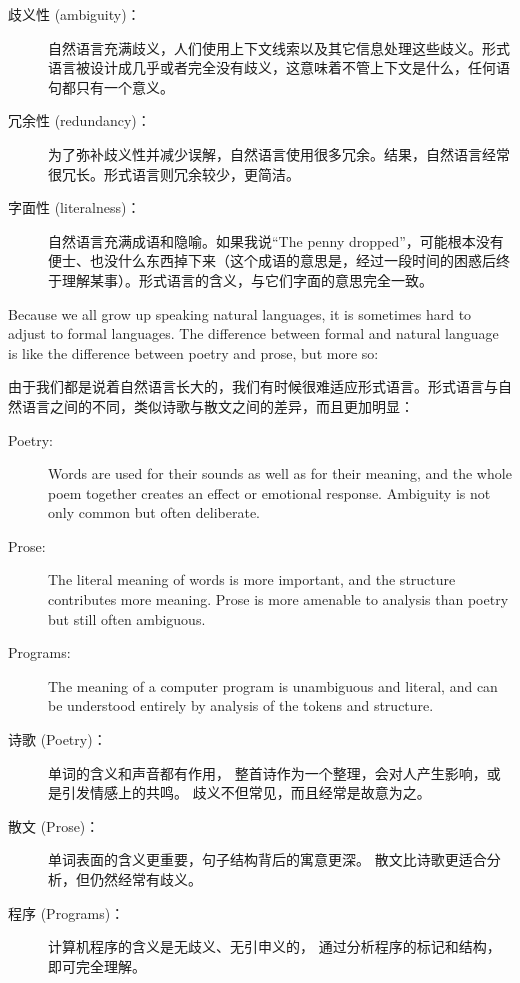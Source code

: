 \begin{description}

\item[歧义性 (ambiguity)：] 自然语言充满歧义，人们使用上下文线索以及其它信息处理这些歧义。形式语言被设计成几乎或者完全没有歧义，这意味着不管上下文是什么，任何语句都只有一个意义。

\item[冗余性 (redundancy)：] 为了弥补歧义性并减少误解，自然语言使用很多冗余。结果，自然语言经常很冗长。形式语言则冗余较少，更简洁。

\item[字面性 (literalness)：] 自然语言充满成语和隐喻。如果我说``The penny dropped''，可能根本没有便士、也没什么东西掉下来（这个成语的意思是，经过一段时间的困惑后终于理解某事）。形式语言的含义，与它们字面的意思完全一致。

\end{description}

Because we all grow up speaking natural languages, it is sometimes
hard to adjust to formal languages.  The difference between formal and
natural language is like the difference between poetry and prose, but
more so:

由于我们都是说着自然语言长大的，我们有时候很难适应形式语言。形式语言与自然语言之间的不同，类似诗歌与散文之间的差异，而且更加明显：
 

\begin{description}

\item[Poetry:] Words are used for their sounds as well as for
their meaning, and the whole poem together creates an effect or
emotional response.  Ambiguity is not only common but often
deliberate.

\item[Prose:] The literal meaning of words is more important,
and the structure contributes more meaning.  Prose is more amenable to
analysis than poetry but still often ambiguous.

\item[Programs:] The meaning of a computer program is unambiguous
and literal, and can be understood entirely by analysis of the
tokens and structure.

\end{description}

\begin{description}

\item[诗歌 (Poetry)：] 单词的含义和声音都有作用， 整首诗作为一个整理，会对人产生影响，或是引发情感上的共鸣。 歧义不但常见，而且经常是故意为之。

\item[散文 (Prose)：] 单词表面的含义更重要，句子结构背后的寓意更深。 散文比诗歌更适合分析，但仍然经常有歧义。

\item[程序 (Programs)：] 计算机程序的含义是无歧义、无引申义的， 通过分析程序的标记和结构，即可完全理解。

\end{description}

